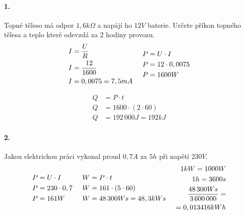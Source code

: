 \documentclass[12pt]{article}
\begin{document}
\paragraph{1.}
Topné těleso má odpor $1,6k\Omega$ a napájí ho $12V$ baterie. Určete příkon topného tělesa a teplo které odevzdá za 2 hodiny provozu.
\begin{equation}
\begin{split}
\nonumber
I&=\frac{U}{R}\\
I&=\frac{12}{1600}\\
I&=0,0075 = 7,5mA
\end{split}
\hspace{0,5cm}
\begin{split}
\nonumber
P&=U\cdot I\\
P&=12\cdot 0,0075\\
P&=1600W
\end{split}
\end{equation}

\begin{equation}
\begin{split}
\nonumber
Q &= P\cdot t\\
Q &= 1600 \cdot (2\cdot 60)\\
Q &= 192\, 000J = 192kJ
\end{split}
\end{equation}

\paragraph{2.}
Jakou elektrickou práci vykonal proud $0,7A$ za $5h$ při napětí $230V$.
\begin{equation}
\begin{split}
\nonumber
P&=U\cdot I\\
P&=230\cdot 0,7\\
P&=161W
\end{split}
\hspace{0,5cm}
\begin{split}
\nonumber
W &= P\cdot t\\
W &= 161 \cdot (5\cdot 60)\\
W &= 48\, 300Ws = 48,3kWs
\end{split}
\hspace{0,5cm}
\begin{split}
\nonumber
1kW = 1000W\\
1h = 3600s\\
\frac{48\, 300Ws}{3\, 600\, 000}= \\
= 0,013416kWh
\end{split}
\end{equation}
\end{document}
